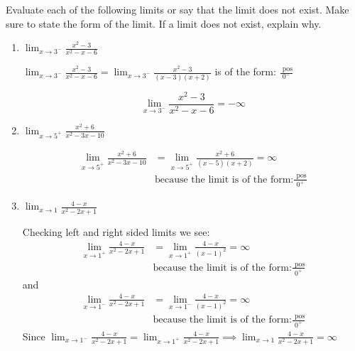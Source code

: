 \documentclass[nooutcomes,handout]{ximera}
\begin{document}
\begin{problem}
  Evaluate each of the following limits or say that the limit does not exist. Make sure to state the form of the limit.
  If a limit does not exist, explain why.

  \begin{enumerate}
	\item
      $\displaystyle \lim_{x \to 3^-} \frac{x^2 - 3}{x^2 - x - 6}$
      \begin{freeResponse} \hfil


         $ \lim_{x \to 3^-} \frac{x^2 - 3}{x^2 - x - 6} = \lim_{x \to 3^-} \frac{x^2 - 3}{(x-3)(x+2)}$  is of the form:  $\frac{\text{ pos}}{0^-}$

	$$\lim_{x \to 3^-} \frac{x^2 - 3}{x^2 - x - 6} =-\infty$$
      \end{freeResponse}

    \item
      $\displaystyle \lim_{x \to 5^+} \frac{x^2 + 6}{x^2 - 3x - 10}$
      \begin{freeResponse}
   
        \begin{align*}
          \lim_{x \to 5^+} \frac{x^2 + 6}{x^2 - 3x - 10} &= \lim_{x \to 5^+} \frac{x^2 + 6}{(x-5)(x+2)}  = \infty \\
	&\text{because the limit is of the form:} \frac{\text{ pos}}{0^+}
        \end{align*}
      \end{freeResponse}

    \item
      $\displaystyle \lim_{x \to 1} \frac{4-x}{x^2 - 2x + 1}$
      \begin{freeResponse}
        Checking left and right sided limits we see:
        \begin{align*}
          \lim_{x \to 1^+} \frac{4-x}{x^2 - 2x + 1} &= \lim_{x \to 1^+}\frac{4-x}{(x-1)^2} = \infty\\
	&\text{because the limit is of the form:} \frac{\text{ pos}}{0^+}
        \end{align*}
 	 and
        \begin{align*}
 	\lim_{x \to 1^-} \frac{4-x}{x^2 - 2x + 1} &= \lim_{x \to 1^-}\frac{4-x}{(x-1)^2} = \infty\\
	&\text{because the limit is of the form:} \frac{\text{ pos}}{0^+}
	\end{align*}
	Since $\lim_{x \to 1^-} \frac{4-x}{x^2 - 2x + 1}=\lim_{x \to 1^+} \frac{4-x}{x^2 - 2x + 1} \implies  \lim_{x \to 1} \frac{4-x}{x^2 - 2x + 1} = \infty$
      \end{freeResponse}


\end{enumerate}
\end{problem}
\end{document}
